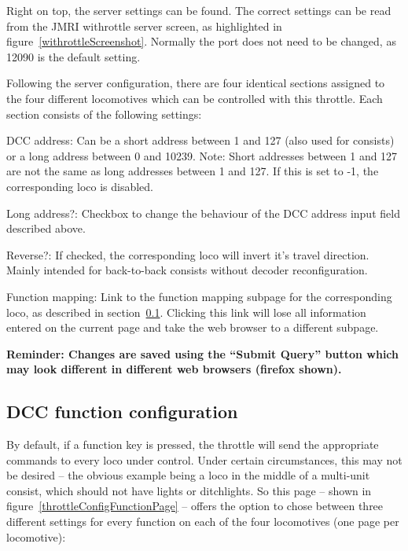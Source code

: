 \documentclass[11pt,a4paper]{scrartcl}
\begin{document}
Right on top, the server settings can be found. The correct settings can be read from the JMRI withrottle server screen, as highlighted in figure~\ref{withrottleScreenshot}. Normally the port does not need to be changed, as 12090 is the default setting.

Following the server configuration, there are four identical sections assigned to the four different locomotives which can be controlled with this throttle. Each section consists of the following settings:

\begin{description}
\item{DCC address:} Can be a short address between 1 and 127 (also used for consists) or a long address between 0 and 10239. Note: Short addresses between 1 and 127 are not the same as long addresses between 1 and 127. If this is set to -1, the corresponding loco is disabled.
\item{Long address?:} Checkbox to change the behaviour of the DCC address input field described above.
\item{Reverse?:} If checked, the corresponding loco will invert it's travel direction. Mainly intended for back-to-back consists without decoder reconfiguration.
\item{Function mapping:} Link to the function mapping subpage for the corresponding loco, as described in section~\ref{throttle_FunctionConf}. Clicking this link will lose all information entered on the current page and take the web browser to a different subpage.
\end{description}

\textbf{Reminder: Changes are saved using the ``Submit Query'' button which may look different in different web browsers (firefox shown).}

\subsection{DCC function configuration} \label{throttle_FunctionConf}

By default, if a function key is pressed, the throttle will send the appropriate commands to every loco under control. Under certain circumstances, this may not be desired -- the obvious example being a loco in the middle of a multi-unit consist, which should not have lights or ditchlights. So this page -- shown in figure~\ref{throttleConfigFunctionPage} -- offers the option to chose between three different settings for every function on each of the four locomotives (one page per locomotive):
\end{document}
